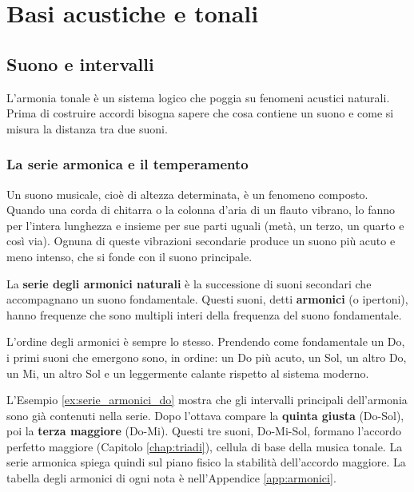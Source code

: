 \part{Basi acustiche e tonali}

\chapter{Suono e intervalli}
\label{chap:fondamenti}

L'armonia tonale è un sistema logico che poggia su fenomeni acustici naturali. Prima di costruire accordi bisogna sapere che cosa contiene un suono e come si misura la distanza tra due suoni.

\section{La serie armonica e il temperamento}
\label{sec:natura_suono}

Un suono musicale, cioè di altezza determinata, è un fenomeno composto. Quando una corda di chitarra o la colonna d'aria di un flauto vibrano, lo fanno per l'intera lunghezza e insieme per sue parti uguali (metà, un terzo, un quarto e così via). Ognuna di queste vibrazioni secondarie produce un suono più acuto e meno intenso, che si fonde con il suono principale.

\begin{definizione}
	\label{def:serie_armonici}
	La \textbf{serie degli armonici naturali} è la successione di suoni secondari che accompagnano un suono fondamentale. Questi suoni, detti \textbf{armonici} (o ipertoni), hanno frequenze che sono multipli interi della frequenza del suono fondamentale.
\end{definizione}

L'ordine degli armonici è sempre lo stesso. Prendendo come fondamentale un Do, i primi suoni che emergono sono, in ordine: un Do più acuto, un Sol, un altro Do, un Mi, un altro Sol e un \Sibemolle{} leggermente calante rispetto al sistema moderno.

\begin{esempio}
	\label{ex:serie_armonici_do}
\end{esempio}

L'Esempio \ref{ex:serie_armonici_do} mostra che gli intervalli principali dell'armonia sono già contenuti nella serie. Dopo l'ottava compare la \textbf{quinta giusta} (Do-Sol), poi la \textbf{terza maggiore} (Do-Mi). Questi tre suoni, Do-Mi-Sol, formano l'accordo perfetto maggiore (Capitolo \ref{chap:triadi}), cellula di base della musica tonale. La serie armonica spiega quindi sul piano fisico la stabilità dell'accordo maggiore. La tabella degli armonici di ogni nota è nell'Appendice \ref{app:armonici}.

